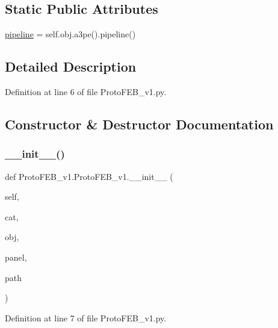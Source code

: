 \subsection*{Static Public Attributes}
\begin{DoxyCompactItemize}
\item 
\hyperlink{classProtoFEB__v1_1_1ProtoFEB__v1_aecb91e3bed2001c4c03c02bfd9fc86b0}{pipeline} = self.\+obj.\+a3pe().pipeline()
\end{DoxyCompactItemize}


\subsection{Detailed Description}


Definition at line 6 of file Proto\+F\+E\+B\+\_\+v1.\+py.



\subsection{Constructor \& Destructor Documentation}
\mbox{\label{classProtoFEB__v1_1_1ProtoFEB__v1_a2b82eb866737571d91b09dd0e88141b7}} 
\subsubsection{\texorpdfstring{\+\_\+\+\_\+init\+\_\+\+\_\+()}{\_\_init\_\_()}}
{\footnotesize\ttfamily def Proto\+F\+E\+B\+\_\+v1.\+Proto\+F\+E\+B\+\_\+v1.\+\_\+\+\_\+init\+\_\+\+\_\+ (\begin{DoxyParamCaption}\item[{}]{self,  }\item[{}]{cat,  }\item[{}]{obj,  }\item[{}]{panel,  }\item[{}]{path }\end{DoxyParamCaption})}



Definition at line 7 of file Proto\+F\+E\+B\+\_\+v1.\+py.



